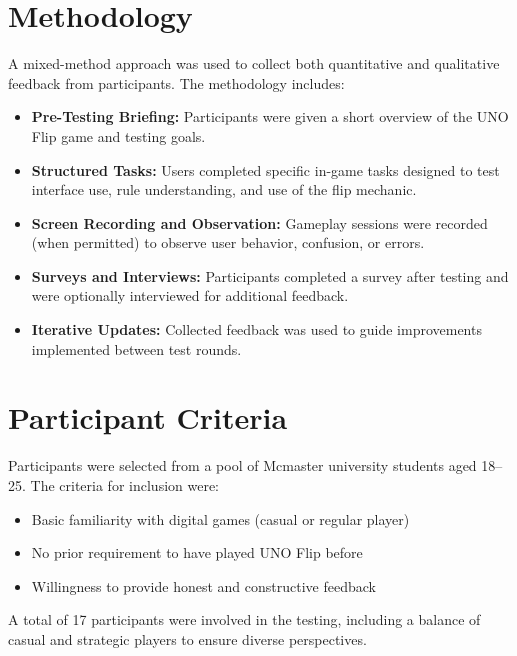 \documentclass[12pt, titlepage]{article}
\begin{document}
\section{Methodology}
A mixed-method approach was used to collect both quantitative and qualitative feedback from participants. The methodology includes:
\begin{itemize}
    \item \textbf{Pre-Testing Briefing:} Participants were given a short overview of the UNO Flip game and testing goals.
    \item \textbf{Structured Tasks:} Users completed specific in-game tasks designed to test interface use, rule understanding, and use of the flip mechanic.
    \item \textbf{Screen Recording and Observation:} Gameplay sessions were recorded (when permitted) to observe user behavior, confusion, or errors.
    \item \textbf{Surveys and Interviews:} Participants completed a survey after testing and were optionally interviewed for additional feedback.
    \item \textbf{Iterative Updates:} Collected feedback was used to guide improvements implemented between test rounds.
\end{itemize}

\section{Participant Criteria}
Participants were selected from a pool of Mcmaster university students aged 18–25. The criteria for inclusion were:
\begin{itemize}
    \item Basic familiarity with digital games (casual or regular player)
    \item No prior requirement to have played UNO Flip before
    \item Willingness to provide honest and constructive feedback
\end{itemize}

A total of 17 participants were involved in the testing, including a balance of casual and strategic players to ensure diverse perspectives.
\end{document}
